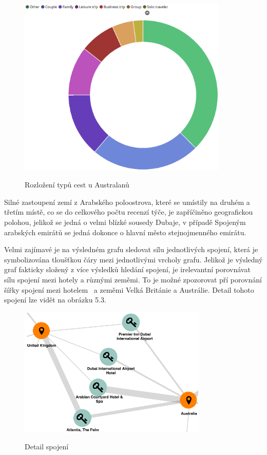 \documentclass[czech,BP]{thesiskiv}
\begin{document}
\begin{figure} [h]
	\centering
	\includegraphics[width=10cm]{img/australia.eps}
	\label{fig:rozlozeniAustralanu}
	\caption{Rozložení typů cest u Australanů}
\end{figure}


Silné zastoupení zemí z Arabského poloostrova, které se umístily na druhém a třetím místě, co se do celkového počtu recenzí týče, je zapříčiněno geografickou polohou, jelikož se jedná o velmi blízké sousedy Dubaje, v případě Spojeným arabských emirátů se jedná dokonce o hlavní město stejnojmenného emirátu.


Velmi zajímavé je na výsledném grafu sledovat sílu jednotlivých spojení, která je symbolizována tloušťkou čáry mezi jednotlivými vrcholy grafu. Jelikož je výsledný graf fakticky složený z více výsledků hledání spojení, je irelevantní porovnávat sílu spojení mezi hotely a různými zeměmi. To je možné zpozorovat pří porovnání šířky spojení mezi hotelem ~a zeměmi Velká Británie a Austrálie. Detail tohoto spojení lze vidět na obrázku 5.3.

\begin{figure} [htbp]
	\centering
	\includegraphics[width= 0.8\textwidth]{img/detail_spojeni.eps}
	\label{fig:DetailSpojeni1}
	\caption{Detail spojení}
\end{figure}
\end{document}

